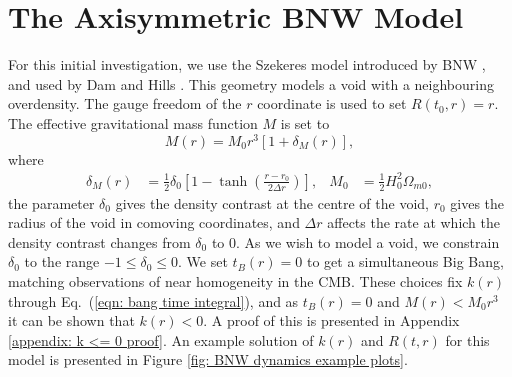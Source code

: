 \documentclass[a4paper,12pt]{report}
\renewcommand{\eqref}[1]{Eq.~({#1})}
\begin{document}
\section{The Axisymmetric BNW Model} \label{section: BNW model description}
For this initial investigation, we use the Szekeres model introduced by BNW \cite{RN3}, and used by Dam \cite{RN6} and Hills \cite{RN42}. This geometry models a void with a neighbouring overdensity. The gauge freedom of the $r$ coordinate is used to set $R(t_0,r)=r$. The effective gravitational mass function $M$ is set to
\begin{equation}\label{eqn: BNW M(r) form}
  M(r) = M_0 r^3 \left[1 + \delta_M(r)\right],
\end{equation}
where
\begin{align}
  \delta_M(r) &= \frac{1}{2}\delta_0\left[1 - \tanh\left(\frac{r-r_0}{2\Delta r}\right)\right], &
  M_0 &= \frac{1}{2}H_0^2 \Omega_{m0},
\end{align}
the parameter $\delta_0$ gives the density contrast at the centre of the void, $r_0$ gives the radius of the void in comoving coordinates, and $\Delta r$ affects the rate at which the density contrast changes from $\delta_0$ to $0$. As we wish to model a void, we constrain $\delta_0$ to the range $-1 \leq \delta_0 \leq 0$.
We set $t_B(r)=0$ to get a simultaneous Big Bang, matching observations of near homogeneity in the CMB. These choices fix $k(r)$ through \eqref{\ref{eqn: bang time integral}}, and as $t_B(r)  = 0$ and $M(r) < M_0 r^3$ it can be shown that $k(r) < 0$. A proof of this is presented in Appendix \ref{appendix: k <= 0 proof}. An example solution of $k(r)$ and $R(t,r)$ for this model is presented in Figure \ref{fig: BNW dynamics example plots}.
\end{document}
